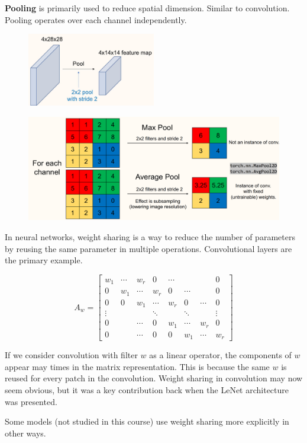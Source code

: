 \begin{concept}[5.8][Pooling]
    \textbf{Pooling} is primarily used to reduce spatial dimension.
    Similar to convolution.
    Pooling operates over each channel independently.

    \begin{figure}[H]
        \centering
        \includegraphics[width=0.5\textwidth]{.././assets/5.6.jpg}
    \end{figure}

    \begin{figure}[H]
        \centering
        \includegraphics[width=1.0\textwidth]{.././assets/5.7.png}
    \end{figure}
\end{concept}

\begin{concept}
    In neural networks, weight sharing is a way to reduce the number of parameters by reusing the same parameter in multiple operations. Convolutional layers are the primary example.

    $$
    A_{w}=\left[\begin{array}{cccccccc}
    w_{1} & \cdots & w_{r} & 0 & \cdots & & & 0 \\
    0 & w_{1} & \cdots & w_{r} & 0 & \cdots & & 0 \\
    0 & 0 & w_{1} & \cdots & w_{r} & 0 & \cdots & 0 \\
    \vdots & & & \ddots & & \ddots & & \vdots \\
    0 & & \cdots & 0 & w_{1} & \cdots & w_{r} & 0 \\
    0 & & \cdots & 0 & 0 & w_{1} & \cdots & w_{r}
    \end{array}\right]
    $$

    If we consider convolution with filter $w$ as a linear operator, the components of $w$ appear may times in the matrix representation.
    This is because the same $w$ is reused for every patch in the convolution.
    Weight sharing in convolution may now seem obvious, but it was a key contribution back when the LeNet architecture was presented.

    Some models (not studied in this course) use weight sharing more explicitly in other ways.
\end{concept}


